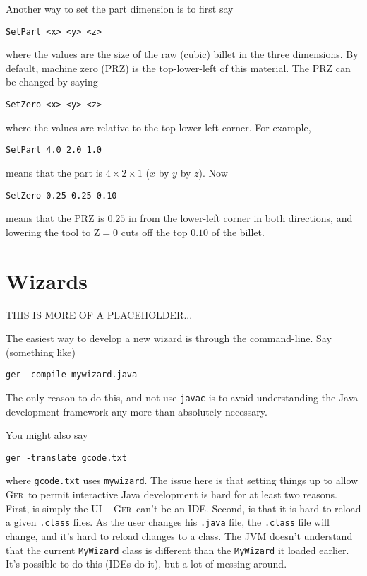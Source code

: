 \documentclass[titlepage,oneside,10pt]{article}
\newcommand{\ger}{\textsc{Ger}}
\begin{document}
Another way to set the part dimension is to first say
\begin{verbatim}
SetPart <x> <y> <z>
\end{verbatim}
where the values are the size of the raw (cubic) billet in the three
dimensions. By default, machine zero (PRZ) is the top-lower-left of
this material. The PRZ can be changed by saying
\begin{verbatim}
SetZero <x> <y> <z>
\end{verbatim}
where the values are relative to the top-lower-left corner. For example,
\begin{verbatim}
SetPart 4.0 2.0 1.0
\end{verbatim}
means that the part is $4\times2\times1$ ($x$ by $y$ by $z$). Now 
\begin{verbatim}
SetZero 0.25 0.25 0.10
\end{verbatim}
means that the PRZ is $0.25$ in from the lower-left corner in both
directions, and lowering the tool to Z$=0$ cuts off the top $0.10$ of
the billet. 



\section{Wizards}

THIS IS MORE OF A PLACEHOLDER...

The easiest way to develop a new wizard is through the
command-line. Say (something like)
\begin{verbatim}
ger -compile mywizard.java
\end{verbatim}
The only reason to do this, and not use {\tt javac} is to avoid
understanding the Java development framework any more than absolutely
necessary.

You might also say
\begin{verbatim}
ger -translate gcode.txt
\end{verbatim}
where {\tt gcode.txt} uses {\tt mywizard}. The issue here is that
setting things up to allow \ger\ to permit interactive Java
development is hard for at least two reasons. First, is simply the
UI -- \ger\ can't be an IDE. Second, is that it is hard to reload a
given {\tt .class} files. As the user changes his {\tt .java} file,
the {\tt .class} file will change, and it's hard to reload changes to
a class. The JVM doesn't understand that the current {\tt MyWizard}
class is different than the {\tt MyWizard} it loaded earlier. It's
possible to do this (IDEs do it), but a lot of messing around.
\end{document}
